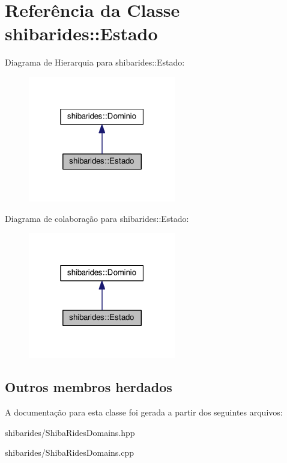 \hypertarget{classshibarides_1_1Estado}{}\section{Referência da Classe shibarides\+:\+:Estado}
\label{classshibarides_1_1Estado}


Diagrama de Hierarquia para shibarides\+:\+:Estado\+:\nopagebreak
\begin{figure}[H]
\begin{center}
\leavevmode
\includegraphics[width=183pt]{classshibarides_1_1Estado__inherit__graph}
\end{center}
\end{figure}


Diagrama de colaboração para shibarides\+:\+:Estado\+:\nopagebreak
\begin{figure}[H]
\begin{center}
\leavevmode
\includegraphics[width=183pt]{classshibarides_1_1Estado__coll__graph}
\end{center}
\end{figure}
\subsection*{Outros membros herdados}


A documentação para esta classe foi gerada a partir dos seguintes arquivos\+:\begin{DoxyCompactItemize}
\item 
shibarides/Shiba\+Rides\+Domains.\+hpp\item 
shibarides/Shiba\+Rides\+Domains.\+cpp\end{DoxyCompactItemize}
